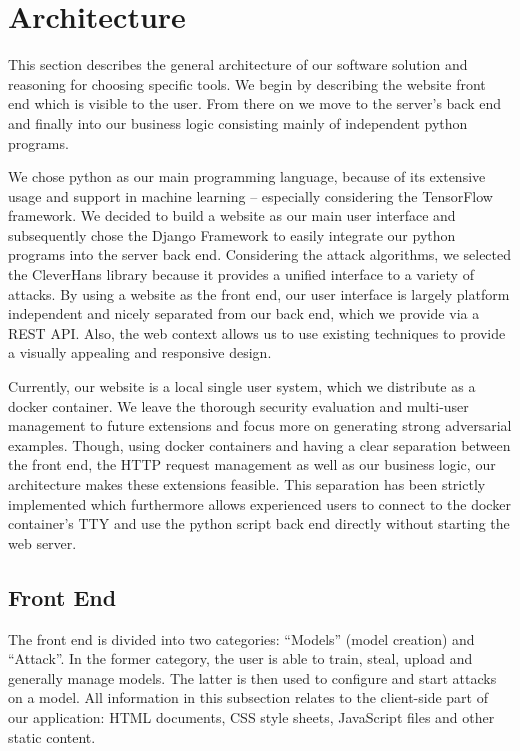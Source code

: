 
\section{Architecture}\label{sec:arch}

This section describes the general architecture of our software solution and reasoning for choosing specific tools.
We begin by describing the website front end which is visible to the user.
From there on we move to the server's back end and finally into our business logic consisting mainly of independent python programs.

We chose python as our main programming language, because of its extensive usage and support in machine learning -- especially considering the TensorFlow framework.
We decided to build a website as our main user interface and subsequently chose the Django Framework to easily integrate our python programs into the server back end.
Considering the attack algorithms, we selected the CleverHans library because it provides a unified interface to a variety of attacks.
By using a website as the front end, our user interface is largely platform independent and nicely separated from our back end, which we provide via a REST API.
Also, the web context allows us to use existing techniques to provide a visually appealing and responsive design.

Currently, our website is a local single user system, which we distribute as a docker container.	
We leave the thorough security evaluation and multi-user management to future extensions and focus more on generating strong adversarial examples.
Though, using docker containers and having a clear separation between the front end, the HTTP request management as well as our business logic, our architecture makes these extensions feasible.
This separation has been strictly implemented which furthermore allows experienced users to connect to the docker container's TTY and use the python script back end directly without starting the web server.

\subsection{Front End}\label{subsec:frontend}

The front end is divided into two categories: \enquote{Models} (model creation) and \enquote{Attack}.
In the former category, the user is able to train, steal, upload and generally manage models. 
The latter is then used to configure and start attacks on a model.
All information in this subsection relates to the client-side part of our application: HTML documents, CSS style sheets, JavaScript files and other static content.

